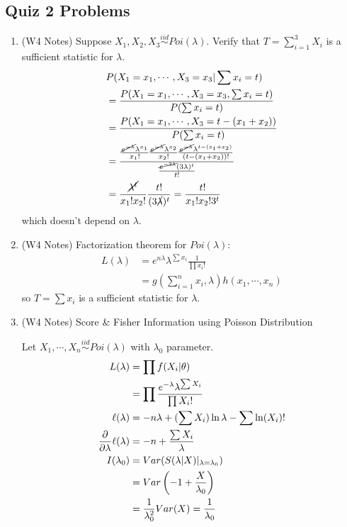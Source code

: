 \documentclass[letterpaper, 8pt]{extarticle}
\begin{document}
\begin{multicols*}{3}
	\section{Quiz 2 Problems}
	\begin{enumerate}[label=\alph*), wide, labelwidth=0pt, labelindent=0pt]
		\item (W4 Notes) Suppose $X_1,X_2,X_3\overset{iid}{\sim}Poi(\lambda)$. Verify that $T=\sum_{i=1}^3X_i$ is a sufficient statistic for $\lambda$.
		\begin{align*}
			&P(X_1=x_1,\cdots,X_3=x_3|\sum x_i=t)\\
			&=\frac{P(X_1=x_1,\cdots,X_3=x_3,\sum x_i=t)}{P(\sum x_i=t)}\\
			&=\frac{P(X_1=x_1,\cdots,X_3=t-(x_1+x_2))}{P(\sum x_i=t)}\\
			&=\frac{\frac{\cancel{e^{-\lambda}}\lambda^{x_1}}{x_1!}\frac{\cancel{e^{-\lambda}}\lambda^{x_2}}{x_2!}\frac{\cancel{e^{-\lambda}}\lambda^{t-(x_1+x_2)}}{(t-(x_1+x_2))!}}{\frac{\cancel{e^{-3\lambda}}(3\lambda)^t}{t!}}\\
			&=\frac{\cancel{\lambda^t}}{x_1!x_2!}\frac{t!}{(3\cancel{\lambda})^t}=\frac{t!}{x_1!x_2!3^t}
		\end{align*}
		which doesn't depend on $\lambda$.
		
		\item (W4 Notes) Factorization theorem for $Poi(\lambda)$:
		\begin{align*}
			L(\lambda)&=e^{n\lambda}\lambda^{\sum x_i}\frac{1}{\prod x_i!}\\
			&=g\left(\sum_{i=1}^nx_i,\lambda\right)h(x_1,\cdots,x_n)
		\end{align*}
		so $T=\sum x_i$ is a sufficient statistic for $\lambda$.
		
		\item (W4 Notes) Score \& Fisher Information using Poisson Distribution
		
		Let $X_1,\cdots,X_n\overset{iid}{\sim}Poi(\lambda)$ with $\lambda_0$ parameter. 
		\begin{align*}
			L(\lambda)&=\prod f(X_i|\theta)\\
			&=\prod\frac{e^{-\lambda}\lambda^{\sum X_i}}{\prod X_i!}\\
			\ell(\lambda)&=-n\lambda +(\sum X_i)\ln\lambda-\sum\ln(X_i)!\\
			\pdv{\lambda}\ell(\lambda)&=-n+\frac{\sum X_i}{\lambda}\\
			I(\lambda_0)&=Var(S(\lambda|X)|_{\lambda=\lambda_0})\\
			&=Var\left(-1+\frac{X}{\lambda_0}\right)\\
			&=\frac{1}{\lambda^2_0}Var(X)=\frac{1}{\lambda_0}
		\end{align*}
	\end{enumerate}
\end{multicols*}
\end{document}
